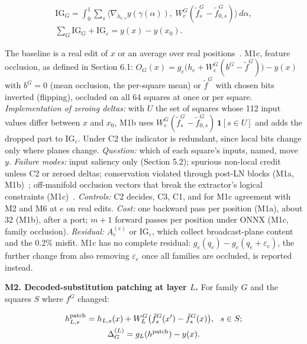 \documentclass[conference]{IEEEtran}
\begin{document}
\[
\begin{gathered}\mathrm{IG}_G=\int_0^1\sum_s\big\langle\nabla_{h_{e,s}}y(\gamma(\alpha)),\ W^G_e(\tilde f^G_s-\tilde f^G_{0,s})\big\rangle\,d\alpha,\\
\sum_G\mathrm{IG}_G+\mathrm{IG}_\varepsilon=y(x)-y(x_0).\end{gathered}
\]

The baseline is a real edit of $x$ or an average over real positions~\cite{lundstrom2022}. M1c, feature occlusion, as defined in Section 6.1: $O_G(x)=g_e\big(h_e+W^G_e(b^G-\tilde f^G)\big)-y(x)$ with $b^G=0$ (mean occlusion, the per-square mean) or $\tilde f^G$ with chosen bits inverted (flipping), occluded on all 64 squares at once or per square. \emph{Implementation of zeroing deltas:} with $U$ the set of squares whose 112 input values differ between $x$ and $x_0$, M1b uses $W^G_e(\tilde f^G_s-\tilde f^G_{0,s})\,\mathbf 1[s\in U]$ and adds the dropped part to $\mathrm{IG}_\varepsilon$. Under C2 the indicator is redundant, since local bits change only where planes change. \emph{Question:} which of each square's inputs, named, move $y$. \emph{Failure modes:} input saliency only (Section 5.2); spurious non-local credit unless C2 or zeroed deltas; conservation violated through post-LN blocks (M1a, M1b)~\cite{ali2022}; off-manifold occlusion vectors that break the extractor's logical constraints (M1c)~\cite{frye2021}. \emph{Controls:} C2 decides, C3, C1, and for M1c agreement with M2 and M6 at $e$ on real edits. \emph{Cost:} one backward pass per position (M1a), about 32 (M1b), after a port; $m+1$ forward passes per position under ONNX (M1c, family occlusion). \emph{Residual:} $A^{(e)}_\varepsilon$ or $\mathrm{IG}_\varepsilon$, which collect broadcast-plane content and the 0.2\% misfit. M1c has no complete residual: $g_e(q_e)-g_e(q_e+\varepsilon_e)$, the further change from also removing $\varepsilon_e$ once all families are occluded, is reported instead.

\textbf{M2. Decoded-substitution patching at layer $L$.} For family $G$ and the squares $S$ where $f^G$ changed:

\[
\begin{gathered}h^{\rm patch}_{L,s}=h_{L,s}(x)+W^G_L\big(\tilde f^G_s(x')-\tilde f^G_s(x)\big),\ \ s\in S;\\
\Delta^{(L)}_G=g_L(h^{\rm patch})-y(x).\end{gathered}
\]
\end{document}
